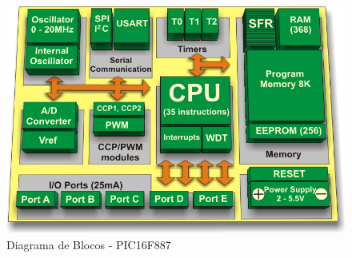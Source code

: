 \begin{figure}[h]
\begin{centering}
\includegraphics[width=0.8\linewidth]{Imagens/Cap_2/microcontrroler_pic}
\par\end{centering}
\caption{Diagrama de Blocos - PIC16F887 \cite{MilanVerle2008} \label{fig:microcontroller}}
\end{figure}

